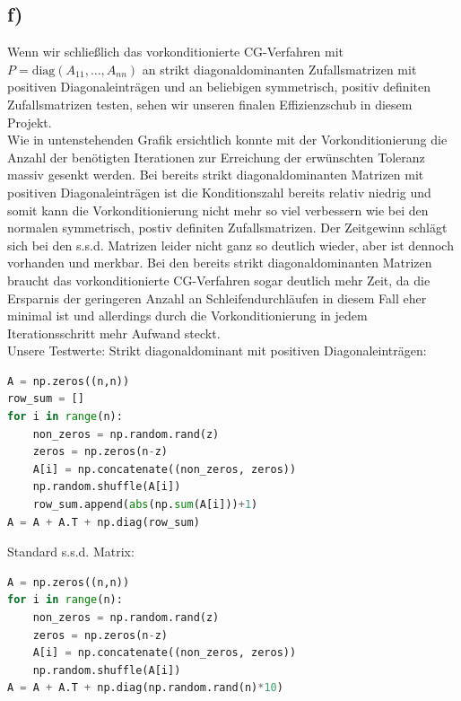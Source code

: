 \subsection*{f)}
Wenn wir schließlich das vorkonditionierte CG-Verfahren mit $P = \text{diag}(A_{11},\dots,A_{nn})$ an strikt diagonaldominanten
Zufallsmatrizen mit positiven Diagonaleinträgen und an beliebigen symmetrisch, positiv definiten Zufallsmatrizen testen, sehen
wir unseren finalen Effizienzschub in diesem Projekt. \\
Wie in untenstehenden Grafik ersichtlich konnte mit der Vorkonditionierung die Anzahl der benötigten Iterationen
zur Erreichung der erwünschten Toleranz massiv gesenkt werden. Bei bereits strikt diagonaldominanten Matrizen mit positiven
Diagonaleinträgen ist die Konditionszahl
bereits relativ niedrig und somit kann die Vorkonditionierung nicht mehr so viel verbessern wie bei den normalen symmetrisch,
postiv definiten Zufallsmatrizen. Der Zeitgewinn schlägt sich bei den s.s.d. Matrizen leider nicht ganz so deutlich wieder,
aber ist dennoch vorhanden und merkbar. Bei den bereits strikt diagonaldominanten Matrizen braucht das vorkonditionierte CG-Verfahren
sogar deutlich mehr Zeit, da die Ersparnis der geringeren Anzahl an Schleifendurchläufen in diesem Fall eher minimal ist und
allerdings durch die Vorkonditionierung in jedem Iterationsschritt mehr Aufwand steckt. \\
Unsere Testwerte: Strikt diagonaldominant mit positiven Diagonaleinträgen: \\
\begin{lstlisting}[language=Python]
A = np.zeros((n,n))
row_sum = []
for i in range(n):
    non_zeros = np.random.rand(z)
    zeros = np.zeros(n-z)
    A[i] = np.concatenate((non_zeros, zeros))
    np.random.shuffle(A[i])
    row_sum.append(abs(np.sum(A[i]))+1)
A = A + A.T + np.diag(row_sum)
\end{lstlisting}
Standard s.s.d. Matrix:
\begin{lstlisting}[language=Python]
A = np.zeros((n,n))
for i in range(n):
    non_zeros = np.random.rand(z)
    zeros = np.zeros(n-z)
    A[i] = np.concatenate((non_zeros, zeros))
    np.random.shuffle(A[i])
A = A + A.T + np.diag(np.random.rand(n)*10)
\end{lstlisting}
\FloatBarrier
